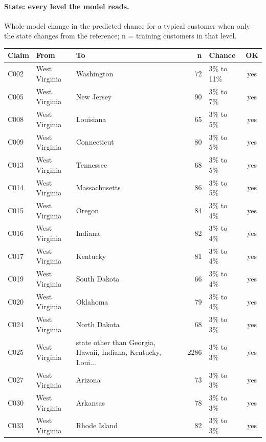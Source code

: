 \documentclass[a4paper,10pt]{article}
\newif\ifreviewmarks
\newcommand{\reviewrule}{\noindent{\color{BrickRed}\rule{\linewidth}{0.8pt}}}
\newenvironment{drafted}[1][]{%
  \ifreviewmarks\par\addvspace{\medskipamount}\reviewrule\par\nopagebreak
  \noindent{\color{BrickRed}\sffamily\footnotesize\textbf{Thesis Draft}\quad #1\hfill review}\par\nopagebreak\smallskip\fi}{%
  \ifreviewmarks\par\smallskip\noindent{\color{BrickRed}\sffamily\footnotesize end of thesis draft}\par\nopagebreak\reviewrule\par\medskip\fi}
\begin{document}
\begin{drafted}[plain-language layer: churn100-s4-c2]
\paragraph{State: every level the model reads.} Whole-model change in the predicted chance for a typical customer when only the state changes from the reference; n = training customers in that level.\par\smallskip
{\scriptsize{}
\begin{longtable}{@{}lllrlc@{}}
\toprule\rowcolor{white}
Claim & From & To & n & Chance & OK \\
\midrule\endhead
\bottomrule\endfoot
C002 & West Virginia & Washington & 72 & 3\% to 11\% & \textcolor{OliveGreen}{yes} \\
C005 & West Virginia & New Jersey & 90 & 3\% to 7\% & \textcolor{OliveGreen}{yes} \\
C008 & West Virginia & Louisiana & 65 & 3\% to 5\% & \textcolor{OliveGreen}{yes} \\
C009 & West Virginia & Connecticut & 80 & 3\% to 5\% & \textcolor{OliveGreen}{yes} \\
C013 & West Virginia & Tennessee & 68 & 3\% to 5\% & \textcolor{OliveGreen}{yes} \\
C014 & West Virginia & Massachusetts & 86 & 3\% to 5\% & \textcolor{OliveGreen}{yes} \\
C015 & West Virginia & Oregon & 84 & 3\% to 4\% & \textcolor{OliveGreen}{yes} \\
C016 & West Virginia & Indiana & 82 & 3\% to 4\% & \textcolor{OliveGreen}{yes} \\
C017 & West Virginia & Kentucky & 81 & 3\% to 4\% & \textcolor{OliveGreen}{yes} \\
C019 & West Virginia & South Dakota & 66 & 3\% to 4\% & \textcolor{OliveGreen}{yes} \\
C020 & West Virginia & Oklahoma & 79 & 3\% to 4\% & \textcolor{OliveGreen}{yes} \\
C024 & West Virginia & North Dakota & 68 & 3\% to 3\% & \textcolor{OliveGreen}{yes} \\
C025 & West Virginia & state other than Georgia, Hawaii, Indiana, Kentucky, Loui... & 2286 & 3\% to 3\% & \textcolor{OliveGreen}{yes} \\
C027 & West Virginia & Arizona & 73 & 3\% to 3\% & \textcolor{OliveGreen}{yes} \\
C030 & West Virginia & Arkansas & 78 & 3\% to 3\% & \textcolor{OliveGreen}{yes} \\
C033 & West Virginia & Rhode Island & 82 & 3\% to 3\% & \textcolor{OliveGreen}{yes} \\

\end{longtable}}
\end{drafted}
\end{document}
